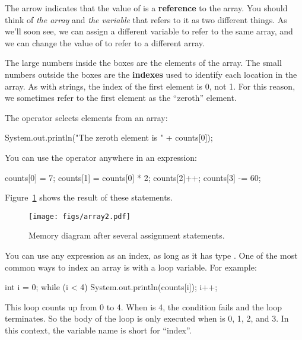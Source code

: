
The arrow indicates that the value of  is a {\bf reference} to the array.
You should think of {\em the array} and {\em the variable} that refers to it as two different things.
As we'll soon see, we can assign a different variable to refer to the same array, and we can change the value of  to refer to a different array.


The large numbers inside the boxes are the elements of the array.
The small numbers outside the boxes are the {\bf indexes} used to identify each location in the array.
As with strings, the index of the first element is 0, not 1.
For this reason, we sometimes refer to the first element as the ``zeroth'' element.

The \java{[]} operator selects elements from an array:

\begin{code}
System.out.println("The zeroth element is " + counts[0]);
\end{code}

You can use the \java{[]} operator anywhere in an expression:

\begin{code}
counts[0] = 7;
counts[1] = counts[0] * 2;
counts[2]++;
counts[3] -= 60;
\end{code}

Figure~\ref{fig.array2} shows the result of these statements.

\begin{figure}[!ht]
\begin{center}
\texttt{[image: figs/array2.pdf]}
\caption{Memory diagram after several assignment statements.}
\label{fig.array2}
\end{center}
\end{figure}

You can use any expression as an index, as long as it has type .
One of the most common ways to index an array is with a loop variable.
For example:

\begin{code}
int i = 0;
while (i < 4) {
    System.out.println(counts[i]);
    i++;
}
\end{code}

This  loop counts up from 0 to 4.
When  is 4, the condition fails and the loop terminates.
So the body of the loop is only executed when  is 0, 1, 2, and 3.
In this context, the variable name  is short for ``index''.

